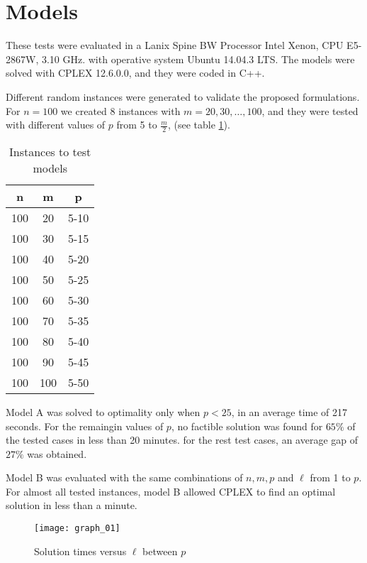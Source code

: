 \section{Models}
%

These tests were evaluated in
a Lanix Spine BW Processor Intel Xenon,
CPU E5-2867W, 3.10 GHz.
with operative system Ubuntu 14.04.3 LTS.
The models were solved with CPLEX 12.6.0.0,
and they were coded in C++.

Different random instances were generated
to validate the proposed formulations.
For $n = 100$ we created 8 instances with $m = 20,30,\ldots,100$,
and they were tested with different values of $p$ from 5 to $\frac{m}{2}$,
(see table \ref{tab:tests}).
\begin{table}
  \centering
  \begin{tabular}{|c|c|c|}\hline
    n & m & p \\ \hline
    100 & 20 & 5-10 \\
    100 & 30 & 5-15 \\
    100 & 40 & 5-20 \\
    100 & 50 & 5-25 \\
    100 & 60 & 5-30 \\
    100 & 70 & 5-35 \\
    100 & 80 & 5-40 \\
    100 & 90 & 5-45 \\
    100 & 100 & 5-50 \\
    \hline
  \end{tabular}
  \caption{Instances to test models}
  \label{tab:tests}
\end{table}

Model A was solved to optimality only when $p < 25$,
in an average time of 217 seconds.
For the remaingin values of $p$, 
no factible solution was found for $65\%$ of the tested cases
in less than 20 minutes.
for the rest test cases,
an average gap of $27\%$ was obtained.

Model B was evaluated
with the same combinations of $n,m,p$
and $\ell$ from 1 to $p$.
For almost all tested instances,
model B allowed CPLEX to find an optimal solution
in less than a minute.
\begin{figure}[!ht]
  \centering
  \texttt{[image: graph\_01]}
  \caption{Solution times versus $\ell$ between $p$}
\end{figure}

